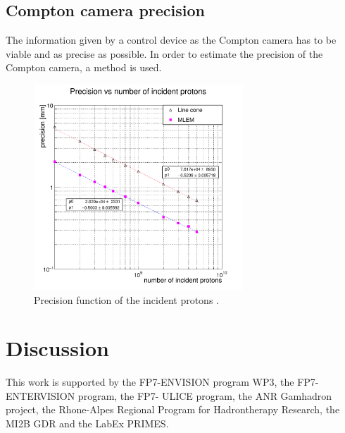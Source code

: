 \documentclass[11pt]{iopart}
\begin{document}
\subsection{Compton camera precision}


The information given by a control device as the Compton camera has to be viable and as precise as possible. In order to estimate the precision of the Compton camera, a method is used. 

	\begin{figure} [!hbtp]	
	\centering
	\caption{Precision function of the incident protons .}	
	\includegraphics[width=0.7\textwidth]{./Figure/2017-08-02_Precision_Comparaison_linecone_MLEM_Article_Fit.pdf}
	\end{figure}




\newpage
\section{Discussion}


\newpage
\ack

This work is supported by the FP7-ENVISION program WP3, the FP7-ENTERVISION program, the FP7- ULICE program, the ANR Gamhadron project, the Rhone-Alpes Regional Program for Hadrontherapy Research, the MI2B GDR and the LabEx PRIMES.\newline



\end{document}
